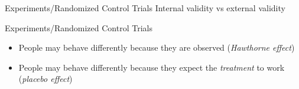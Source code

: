 \documentclass[presentation]{beamer}
\begin{document}
\begin{frame}[label={sec:orga354ebf}]{Experiments/Randomized Control Trials}
\Large{Internal validity vs external validity}
\end{frame}


\begin{frame}[label={sec:orge993a55}]{Experiments/Randomized Control Trials}
\begin{itemize}
\item People may behave differently because they are observed (\emph{Hawthorne effect})
\item People may behave differently because they expect the \emph{treatment} to work (\emph{placebo effect})
\end{itemize}
\end{frame}
\end{document}
